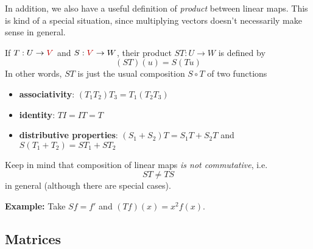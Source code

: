 {
In addition, we also have a useful definition of \emph{product} between linear maps. This is kind of a special situation, since multiplying vectors doesn't necessarily make sense in general. 
}

{
If $T:U\to {\color{red}V}$ and $S:{\color{red}V} \to W$, their product $ST:U \to W$ is defined by
%
\[
(ST)(u) = S(Tu)
\]
%
In other words, $ST$ is just the usual composition $S\circ T$ of two functions
}


\begin{itemize}
\item \textbf{associativity}: $(T_1 T_2)T_3 = T_1 (T_2 T_3)$

\item \textbf{identity}: $TI = IT = T$

\item \textbf{distributive properties}: $(S_1+S_2)T = S_1 T + S_2 T$ and $S(T_1 + T_2) = S T_1 + ST_2$
\end{itemize}

{
Keep in mind that composition of linear maps \emph{is not commutative}, i.e. \[ST\neq TS\] in general (although there are special cases).

\textbf{Example:} Take $Sf = f'$ and $(Tf)(x) = x^2 f(x)$.
}

\subsection{Matrices} 

